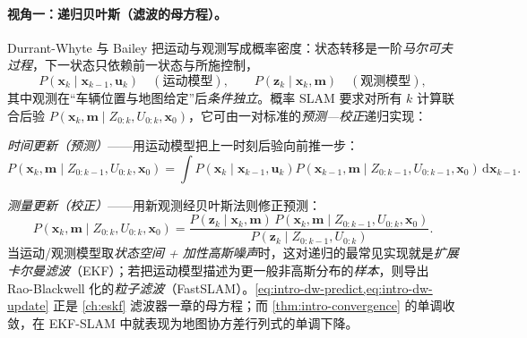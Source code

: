 \paragraph{视角一：递归贝叶斯（滤波的母方程）。}
Durrant-Whyte 与 Bailey\cite{durrantwhyte2006slam} 把运动与观测写成概率密度：状态转移是一阶\emph{马尔可夫过程}，下一状态只依赖前一状态与所施控制，
\begin{equation}
  P\!\left(\mathbf{x}_k\mid \mathbf{x}_{k-1},\mathbf{u}_k\right)\quad(\text{运动模型}),\qquad
  P\!\left(\mathbf{z}_k\mid \mathbf{x}_k,\mathbf{m}\right)\quad(\text{观测模型}),
  \label{eq:intro-dw-models}
\end{equation}
其中观测在“车辆位置与地图给定”后\emph{条件独立}。概率 SLAM 要求对所有 $k$ 计算联合后验 $P(\mathbf{x}_k,\mathbf{m}\mid Z_{0:k},U_{0:k},\mathbf{x}_0)$，它可由一对标准的\emph{预测—校正}递归实现\cite{durrantwhyte2006slam}：

\emph{时间更新（预测）}——用运动模型把上一时刻后验向前推一步：
\begin{equation}
  P\!\left(\mathbf{x}_k,\mathbf{m}\mid Z_{0:k-1},U_{0:k},\mathbf{x}_0\right)
  =\int P\!\left(\mathbf{x}_k\mid \mathbf{x}_{k-1},\mathbf{u}_k\right)
  P\!\left(\mathbf{x}_{k-1},\mathbf{m}\mid Z_{0:k-1},U_{0:k-1},\mathbf{x}_0\right)\,\mathrm{d}\mathbf{x}_{k-1}.
  \label{eq:intro-dw-predict}
\end{equation}

\emph{测量更新（校正）}——用新观测经贝叶斯法则修正预测：
\begin{equation}
  P\!\left(\mathbf{x}_k,\mathbf{m}\mid Z_{0:k},U_{0:k},\mathbf{x}_0\right)
  =\frac{P\!\left(\mathbf{z}_k\mid \mathbf{x}_k,\mathbf{m}\right)\,
         P\!\left(\mathbf{x}_k,\mathbf{m}\mid Z_{0:k-1},U_{0:k},\mathbf{x}_0\right)}
        {P\!\left(\mathbf{z}_k\mid Z_{0:k-1},U_{0:k}\right)}.
  \label{eq:intro-dw-update}
\end{equation}
当运动/观测模型取\emph{状态空间 + 加性高斯噪声}时，这对递归的最常见实现就是\emph{扩展卡尔曼滤波}（EKF）；若把运动模型描述为更一般非高斯分布的\emph{样本}，则导出 Rao-Blackwell 化的\emph{粒子滤波}（FastSLAM）\cite{durrantwhyte2006slam}。\cref{eq:intro-dw-predict,eq:intro-dw-update} 正是 \cref{ch:eskf} 滤波器一章的母方程；而 \cref{thm:intro-convergence} 的单调收敛，在 EKF-SLAM 中就表现为地图协方差行列式的单调下降。


